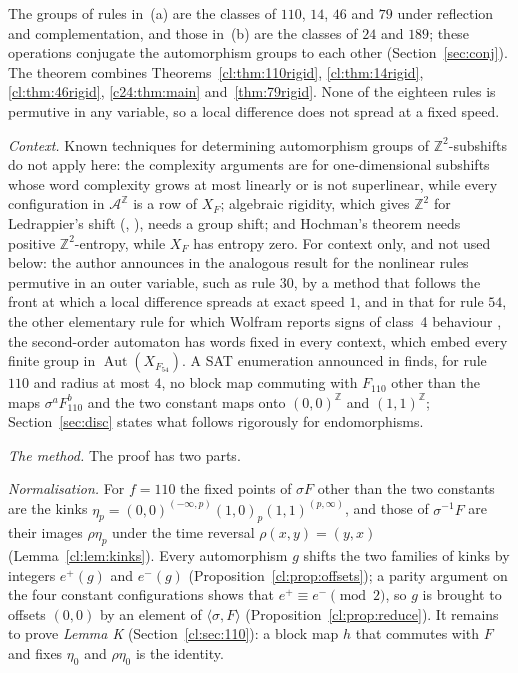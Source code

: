 \documentclass[11pt]{amsart}
\theoremstyle{definition}
\theoremstyle{remark}
\theoremstyle{plain}
\newcommand{\Z}{\mathbb{Z}}
\newcommand{\A}{\mathcal{A}}
\newcommand{\Aut}{\operatorname{Aut}}
\newcommand{\sh}{\sigma}
\begin{document}
The groups of rules in~(a) are the classes of $110$, $14$, $46$ and $79$ under reflection and complementation, and those in~(b) are the classes of $24$ and $189$; these operations conjugate the automorphism groups to each other (Section~\ref{sec:conj}). The theorem combines Theorems~\ref{cl:thm:110rigid}, \ref{cl:thm:14rigid}, \ref{cl:thm:46rigid}, \ref{c24:thm:main} and~\ref{thm:79rigid}. None of the eighteen rules is permutive in any variable, so a local difference does not spread at a fixed speed.

\emph{Context.} Known techniques for determining automorphism groups of $\Z^2$-subshifts do not apply here: the complexity arguments \cite{CK2015,DDMP2016} are for one-dimensional subshifts whose word complexity grows at most linearly or is not superlinear, while every configuration in $\A^{\Z}$ is a row of $X_F$; algebraic rigidity, which gives $\Z^2$ for Ledrappier's shift \cite{Ledrappier1978} (\cite{Ward1994}, \cite[Theorem~7]{BRY2018}), needs a group shift; and Hochman's theorem \cite{Hochman2010} needs positive $\Z^2$-entropy, while $X_F$ has entropy zero. For context only, and not used below: the author announces in \cite{PaperB} the analogous result for the nonlinear rules permutive in an outer variable, such as rule $30$, by a method that follows the front at which a local difference spreads at exact speed $1$, and in \cite{PaperC} that for rule $54$, the other elementary rule for which Wolfram reports signs of class~4 behaviour \cite[pp.~693--697]{Wolfram2002}, the second-order automaton has words fixed in every context, which embed every finite group in $\Aut(X_{F_{54}})$. A SAT enumeration announced in \cite{PaperD} finds, for rule $110$ and radius at most $4$, no block map commuting with $F_{110}$ other than the maps $\sh^aF_{110}^b$ and the two constant maps onto $(0,0)^{\Z}$ and $(1,1)^{\Z}$; Section~\ref{sec:disc} states what follows rigorously for endomorphisms.

\emph{The method.} The proof has two parts.

\emph{Normalisation.} For $f=110$ the fixed points of $\sh F$ other than the two constants are the kinks $\eta_p=(0,0)^{(-\infty,p)}(1,0)_p(1,1)^{(p,\infty)}$, and those of $\sh^{-1}F$ are their images $\rho\eta_p$ under the time reversal $\rho(x,y)=(y,x)$ (Lemma~\ref{cl:lem:kinks}). Every automorphism $g$ shifts the two families of kinks by integers $e^+(g)$ and $e^-(g)$ (Proposition~\ref{cl:prop:offsets}); a parity argument on the four constant configurations shows that $e^+\equiv e^-\pmod2$, so $g$ is brought to offsets $(0,0)$ by an element of $\langle\sh,F\rangle$ (Proposition~\ref{cl:prop:reduce}). It remains to prove \emph{Lemma K} (Section~\ref{cl:sec:110}): a block map $h$ that commutes with $F$ and fixes $\eta_0$ and $\rho\eta_0$ is the identity.
\end{document}
